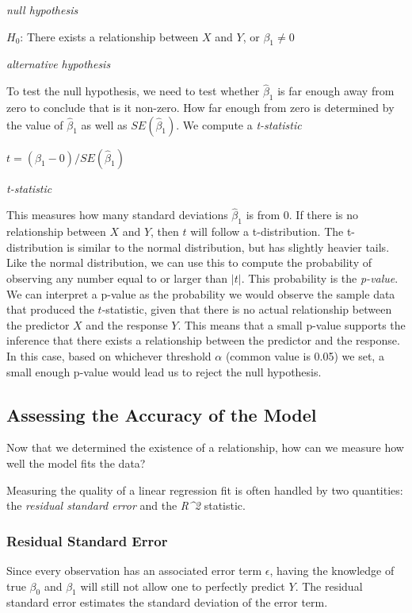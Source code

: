 \documentclass[]{book}
\theoremstyle{definition}
\theoremstyle{definition}
\theoremstyle{definition}
\theoremstyle{remark}
\begin{document}
\emph{null hypothesis}

\(H_0\): There exists a relationship between \(X\) and \(Y\), or
\(\beta_1 \neq 0\)

\emph{alternative hypothesis}

To test the null hypothesis, we need to test whether \(\hat\beta_1\) is
far enough away from zero to conclude that is it non-zero. How far
enough from zero is determined by the value of \(\hat\beta_1\) as well
as \(SE(\hat\beta_1)\). We compute a \emph{t-statistic}

\(t = (\beta_1 - 0)/SE(\hat\beta_1)\)

\emph{t-statistic}

This measures how many standard deviations \(\hat\beta_1\) is from 0. If
there is no relationship between \(X\) and \(Y\), then \(t\) will follow
a t-distribution. The t-distribution is similar to the normal
distribution, but has slightly heavier tails. Like the normal
distribution, we can use this to compute the probability of observing
any number equal to or larger than \(|t|\). This probability is the
\emph{p-value}. We can interpret a p-value as the probability we would
observe the sample data that produced the \(t\)-statistic, given that
there is no actual relationship between the predictor \(X\) and the
response \(Y\). This means that a small p-value supports the inference
that there exists a relationship between the predictor and the response.
In this case, based on whichever threshold \(\alpha\) (common value is
0.05) we set, a small enough p-value would lead us to reject the null
hypothesis.

\subsection{Assessing the Accuracy of the
Model}\label{assessing-the-accuracy-of-the-model}

Now that we determined the existence of a relationship, how can we
measure how well the model fits the data?

Measuring the quality of a linear regression fit is often handled by two
quantities: the \emph{residual standard error} and the \emph{R\^{}2}
statistic.

\subsubsection{Residual Standard Error}\label{residual-standard-error}

Since every observation has an associated error term \(\epsilon\),
having the knowledge of true \(\beta_0\) and \(\beta_1\) will still not
allow one to perfectly predict \(Y\). The residual standard error
estimates the standard deviation of the error term.
\end{document}
